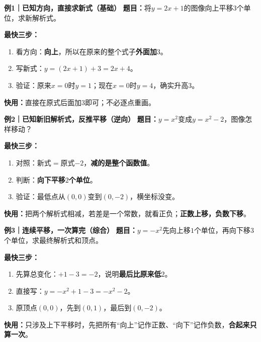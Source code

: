 \begin{examplebox}
  \textbf{\textcolor{CExample}{例1｜已知方向，直接求新式（基础）}}
  \textbf{题目：}将$y=2x+1$的图像向上平移$3$个单位，求新解析式。

  \textbf{最快三步：}
  \begin{enumerate}[leftmargin=*,itemsep=0.2em,topsep=0.2em]
    \item 看方向：\textbf{向上}，所以在原来的整个式子\textbf{外面加$3$}。
    \item 写新式：$y=(2x+1)+3=\boxed{2x+4}$。
    \item 验证：原来$x=0$时$y=1$；现在$x=0$时$y=4$，确实升高$3$。
  \end{enumerate}
  \begin{center}
  
  \end{center}
  \textbf{快用：}直接在原式后面加$3$即可；不必逐点重画。

\end{examplebox}

\begin{examplebox}
  \textbf{\textcolor{CExample}{例2｜已知新旧解析式，反推平移（逆向）}}
  \textbf{题目：}$y=x^2$变成$y=x^2-2$，图像怎样移动？

  \textbf{最快三步：}
  \begin{enumerate}[leftmargin=*,itemsep=0.2em,topsep=0.2em]
    \item 对照：新式$=$原式$-2$，\textbf{减的是整个函数值}。
    \item 判断：\textbf{向下平移$2$个单位}。
    \item 验证：最低点从$(0,0)$变到$(0,-2)$，横坐标没变。
  \end{enumerate}
  \begin{center}
  
  \end{center}
  \textbf{快用：}把两个解析式相减，若差是一个常数，就看正负；\textbf{正数上移，负数下移}。

\end{examplebox}

\begin{examplebox}
  \textbf{\textcolor{CExample}{例3｜连续平移，一次算完（综合）}}
  \textbf{题目：}$y=-x^2$先向上移$1$个单位，再向下移$3$个单位，求最终解析式和顶点。

  \textbf{最快三步：}
  \begin{enumerate}[leftmargin=*,itemsep=0.2em,topsep=0.2em]
    \item 先算总变化：$+1-3=-2$，说明\textbf{最后比原来低$2$}。
    \item 直接写：$y=-x^2+1-3=\boxed{-x^2-2}$。
    \item 原顶点$(0,0)$，先到$(0,1)$，最后到$\boxed{(0,-2)}$。
  \end{enumerate}
  \begin{center}
  
  \end{center}
  \textbf{快用：}只涉及上下平移时，先把所有“向上”记作正数、“向下”记作负数，\textbf{合起来只算一次}。
\end{examplebox}
